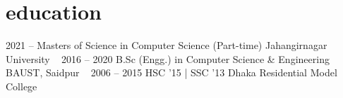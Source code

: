 \section{education}
\begin{entrylist}
	\entry
	{2021 --}
	{Masters of Science {\normalfont in Computer Science (Part-time)}}
	{Jahangirnagar University}
	~
	\entry
	{2016 -- 2020}
	{B.Sc (Engg.) {\normalfont in Computer Science \& Engineering}}
	{BAUST, Saidpur}
	~
	\entry
	{2006 -- 2015}
	{HSC {\normalfont '15} | SSC {\normalfont '13}}
	{Dhaka Residential Model College}
	~
\end{entrylist}


